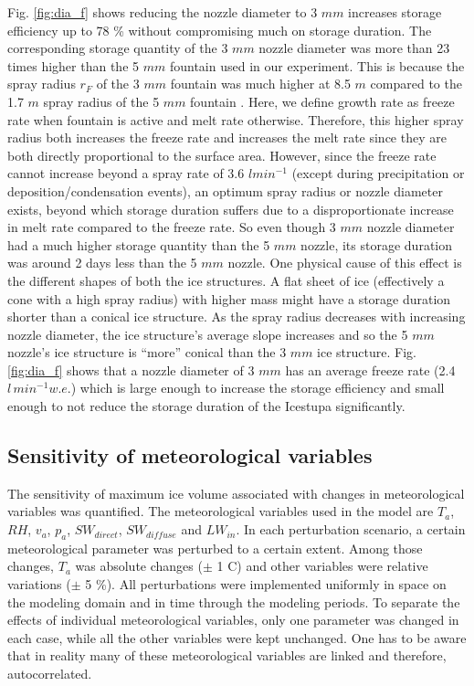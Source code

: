 \documentclass[utf8]{frontiersSCNS} %
\begin{document}
Fig. \ref{fig:dia_f} shows reducing the nozzle diameter to 3 $mm$ increases storage efficiency up to 78 \% without
compromising much on storage duration.  The corresponding storage quantity of the 3 $mm$ nozzle diameter was more than
23 times higher than the 5 $mm$ fountain used in our experiment. This is because the spray radius $r_F$ of the 3 $mm$
fountain was much higher at 8.5 $m$ compared to the 1.7 $m$ spray radius of the 5 $mm$ fountain . Here, we define
growth rate as freeze rate when fountain is active and melt rate otherwise. Therefore, this higher spray radius both
increases the freeze rate  and increases the melt rate since they are both directly proportional to the surface area.
However, since the freeze rate cannot increase beyond a spray rate of 3.6 $l min^{-1}$ (except during precipitation or
deposition/condensation events), an optimum spray radius or nozzle diameter exists, beyond which storage duration
suffers due to a disproportionate increase in melt rate compared to the freeze rate. So even though 3 $mm$ nozzle
diameter had a much higher storage quantity than the 5 $mm$ nozzle, its storage duration was around 2 days less than
the 5 $mm$ nozzle. One physical cause of this effect is the different shapes of both the ice structures. A flat sheet
of ice (effectively a cone with a high spray radius) with higher mass might have a storage duration shorter than a
conical ice structure. As the spray radius decreases with increasing nozzle diameter, the ice structure’s average
slope increases and so the 5 $mm$ nozzle's ice structure is ``more'' conical than the 3 $mm$ ice structure. Fig.
\ref{fig:dia_f} shows that a nozzle diameter of 3 $mm$ has an average freeze rate (2.4 $l \,min^{-1} w.e.$) which is
large enough to increase the storage efficiency and small enough to not reduce the storage duration of the Icestupa
significantly.


\subsection{Sensitivity of meteorological variables}


The sensitivity of maximum ice volume associated with changes in meteorological variables was quantified. The
meteorological variables used in the model are $T_a$, $RH$, $v_a$, $p_a$, $SW_{direct}$, $SW_{diffuse}$ and $LW_{in}$.
In each perturbation scenario, a certain meteorological parameter was perturbed to a certain extent.  Among those
changes, $T_a$ was absolute changes ($\pm$ 1 \degree C) and other variables were relative variations ($\pm$ 5 \%).
All perturbations were implemented uniformly in space on the modeling domain and in time through the modeling periods.
To separate the effects of individual meteorological variables, only one parameter was changed in each case, while all
the other variables were kept unchanged. One has to be aware that in reality many of these meteorological variables
are linked and therefore, autocorrelated. 
\end{document}
